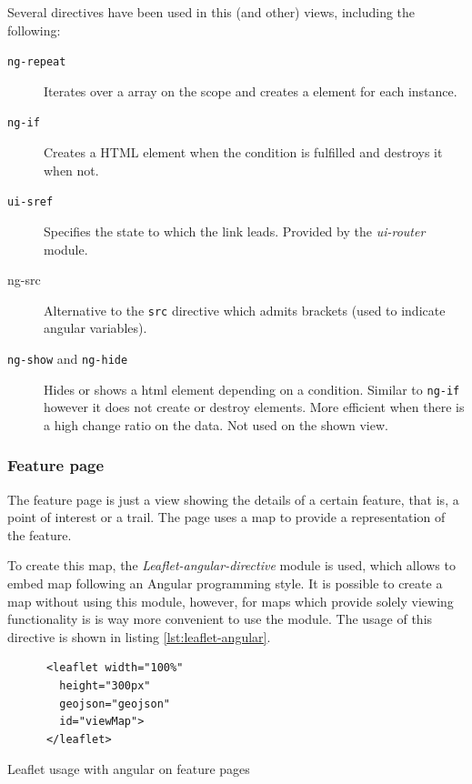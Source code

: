 Several directives have been used in this (and other) views, including the following:

\begin{description}
\item[\texttt{ng-repeat}] Iterates over a array on the scope and creates a element for each instance.
\item[\texttt{ng-if}] Creates a HTML element when the condition is fulfilled and destroys it when not.
\item[\texttt{ui-sref}] Specifies the state to which the link leads. Provided by the \textit{ui-router} module.
\item[ng-src] Alternative to the \texttt{src} directive which admits brackets (used to indicate angular variables).
\item[\texttt{ng-show} and \texttt{ng-hide}] Hides or shows a html element depending on a condition. Similar to \texttt{ng-if} however it does not create or destroy elements. More efficient when there is a high change ratio on the data. Not used on the shown view.
\end{description}

\subsubsection*{Feature page}

The feature page is just a view showing the details of a certain feature, that is, a point of interest or a trail. The page uses a map to provide a representation of the feature.

To create this map, the \textit{Leaflet-angular-directive} module is used, which allows to embed map following an Angular programming style. It is possible to create a map without using this module, however, for maps which provide solely viewing functionality is is way more convenient to use the module. The usage of this directive is shown in listing \ref{lst:leaflet-angular}.

\begin{listing}[ht]\centering
  \begin{minipage}{.4\textwidth}
    \begin{verbatim}
      <leaflet width="100%" 
        height="300px" 
        geojson="geojson" 
        id="viewMap">
      </leaflet>
    \end{verbatim}
  \end{minipage}
  \caption{Leaflet usage with angular on feature pages}\label{lst:leaflet-angular}
\end{listing}

